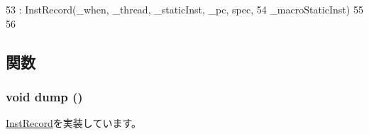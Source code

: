 \begin{DoxyCode}
53         : InstRecord(_when, _thread, _staticInst, _pc, spec,
54                 _macroStaticInst)
55     {
56     }
\end{DoxyCode}


\subsection{関数}
\hypertarget{classTrace_1_1LegionTraceRecord_accd2600060dbaee3a3b41aed4034c63c}{
\subsubsection[{dump}]{\setlength{\rightskip}{0pt plus 5cm}void dump ()}}
\label{classTrace_1_1LegionTraceRecord_accd2600060dbaee3a3b41aed4034c63c}


\hyperlink{classTrace_1_1InstRecord_abf1ad25f5e8a680b74ae28575b1f0539}{InstRecord}を実装しています。


